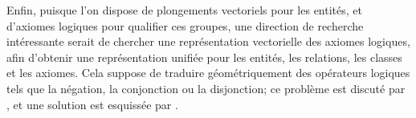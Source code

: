 

Enfin, puisque l'on dispose de plongements vectoriels pour les entités, et d'axiomes logiques pour qualifier ces groupes, une direction de recherche intéressante serait de chercher une représentation vectorielle des axiomes logiques, afin d'obtenir une représentation unifiée pour les entités, les relations, les classes et les axiomes. 
Cela suppose de traduire géométriquement des opérateurs logiques tels que la négation, la conjonction ou la disjonction; ce problème est discuté par
\cite{gutierrez2018knowledge}, et une solution est esquissée par \cite{hao2019universal}.
